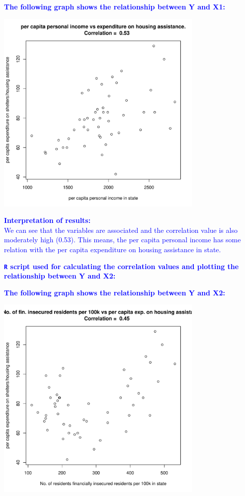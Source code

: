 \documentclass[12pt,letterpaper]{article}
\begin{document}
\begin{itemize}
\textcolor{blue}{
	\noindent \textbf{The following graph shows the relationship between Y and X1:}
}
\begin{center}
\includegraphics[width=10cm]{plot_Y_X1.pdf}  
\end{center}

\textcolor{blue}{
	\textbf{Interpretation of results:}\\
We can see that the variables are associated and the correlation value is also moderately high (0.53). This means, the per capita personal income has some relation with the per capita expenditure on housing assistance in state.
}

\pagebreak

\textcolor{blue}{
	\noindent \textbf{\texttt{R} script used for calculating the correlation values and plotting the relationship between Y and X2:}
}

  

\vspace{.25cm}

\textcolor{blue}{
	\noindent \textbf{The following graph shows the relationship between Y and X2:}
}
\begin{center}
	\includegraphics[width=10cm]{plot_Y_X2.pdf}  
\end{center}


\end{itemize}
\end{document}
